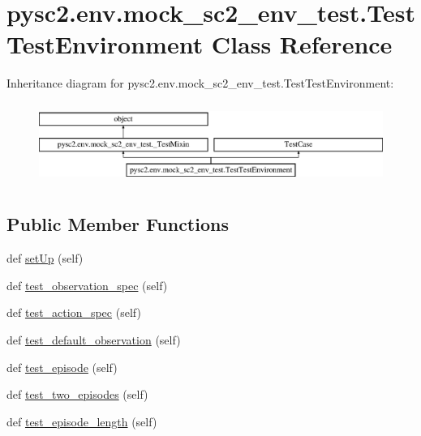 \hypertarget{classpysc2_1_1env_1_1mock__sc2__env__test_1_1_test_test_environment}{}\section{pysc2.\+env.\+mock\+\_\+sc2\+\_\+env\+\_\+test.\+Test\+Test\+Environment Class Reference}
\label{classpysc2_1_1env_1_1mock__sc2__env__test_1_1_test_test_environment}
Inheritance diagram for pysc2.\+env.\+mock\+\_\+sc2\+\_\+env\+\_\+test.\+Test\+Test\+Environment\+:\begin{figure}[H]
\begin{center}
\leavevmode
\includegraphics[height=2.683706cm]{classpysc2_1_1env_1_1mock__sc2__env__test_1_1_test_test_environment}
\end{center}
\end{figure}
\subsection*{Public Member Functions}
\begin{DoxyCompactItemize}
\item 
def \mbox{\hyperlink{classpysc2_1_1env_1_1mock__sc2__env__test_1_1_test_test_environment_ab1777ba2b45423fcd3839b0a8ae9c527}{set\+Up}} (self)
\item 
def \mbox{\hyperlink{classpysc2_1_1env_1_1mock__sc2__env__test_1_1_test_test_environment_a20ae54f2eb52813c327126d1458737c1}{test\+\_\+observation\+\_\+spec}} (self)
\item 
def \mbox{\hyperlink{classpysc2_1_1env_1_1mock__sc2__env__test_1_1_test_test_environment_a312751a3183b6d875de587b3bbcdc75d}{test\+\_\+action\+\_\+spec}} (self)
\item 
def \mbox{\hyperlink{classpysc2_1_1env_1_1mock__sc2__env__test_1_1_test_test_environment_a759620870738ce8ec26fe5225efd7b9d}{test\+\_\+default\+\_\+observation}} (self)
\item 
def \mbox{\hyperlink{classpysc2_1_1env_1_1mock__sc2__env__test_1_1_test_test_environment_a547b035acb5d19906f9415468e36b752}{test\+\_\+episode}} (self)
\item 
def \mbox{\hyperlink{classpysc2_1_1env_1_1mock__sc2__env__test_1_1_test_test_environment_a9fe7204329cf049374fd6262d83e2b04}{test\+\_\+two\+\_\+episodes}} (self)
\item 
def \mbox{\hyperlink{classpysc2_1_1env_1_1mock__sc2__env__test_1_1_test_test_environment_aa1960f0f601a8cd116dfde951b6a7c6a}{test\+\_\+episode\+\_\+length}} (self)
\end{DoxyCompactItemize}



